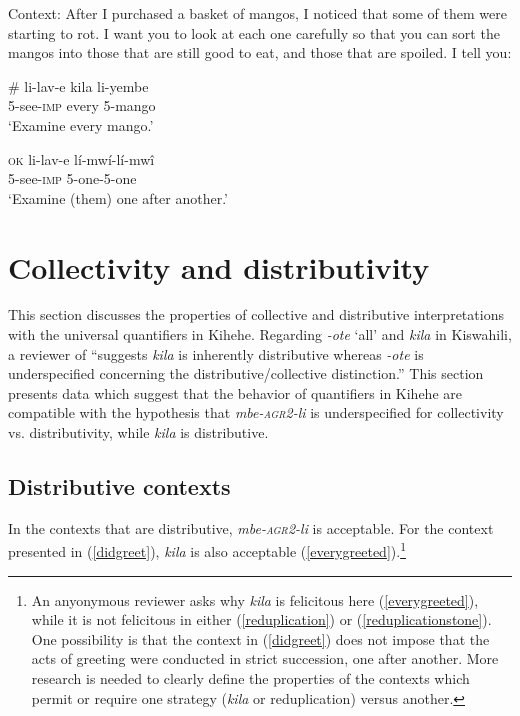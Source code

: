 \documentclass[letterpaper, 12pt]{article}
\begin{document}
\begin{exe}
\singlespacing
 \ex Context: After I purchased a basket of mangos, I noticed that some of them were starting to rot. I want you to look at each one carefully so that you can sort the mangos into those that are still good to eat, and those that are spoiled. I tell you: \label{onebyone} \\

\begin{xlist}

\ex \gll \# li-lav-e kila li-yembe \\
{} 5-see-\textsc{imp} every 5-mango \\
`Examine every mango.' \\

\vspace{5mm}

\ex \gll \textsc{ok} li-lav-e l\'i-mw\'i-l\'i-mw\^i \\
{} 5-see-\textsc{imp} 5-one-5-one \\ \label{reduplication}
`Examine (them) one after another.'

\end{xlist}
\end{exe}


\section{Collectivity and distributivity}

This section discusses the properties of collective and distributive interpretations with the universal quantifiers in Kihehe. 
Regarding \textit{-ote} `all' and \textit{kila} in Kiswahili, a reviewer of  ``suggests \textit{kila} is inherently distributive whereas \textit{-ote} is underspecified concerning the distributive/collective distinction.''  This section presents data which suggest that the behavior of quantifiers in Kihehe are compatible with the hypothesis that \textit{mbe-\textsc{agr2}-li} is underspecified for collectivity vs. distributivity, while \textit{kila} is distributive.

\subsection{Distributive contexts}

In the contexts that are distributive, \textit{mbe-\textsc{agr2}-li} is acceptable. For the context presented in (\ref{didgreet}), \textit{kila} is also acceptable (\ref{everygreeted}).\footnote{An anyonymous reviewer asks why \textit{kila} is felicitous here (\ref{everygreeted}), while it is not felicitous in either (\ref{reduplication}) or (\ref{reduplicationstone}). One possibility is that the context in (\ref{didgreet}) does not impose that the acts of greeting were conducted in strict succession, one after another.  More research is needed to clearly define the properties of the contexts which permit or require one strategy (\textit{kila} or reduplication) versus another.} 
\end{document}
